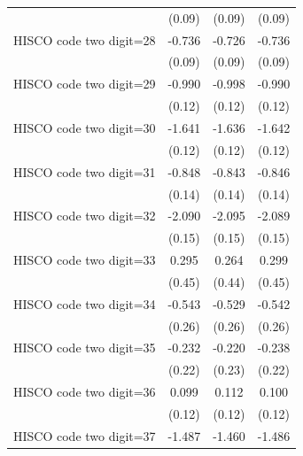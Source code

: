 {\begin{tabular}{l*{3}{c}}
                    &      (0.09)         &      (0.09)         &      (0.09)         \\
HISCO code two digit=28&      -0.736\sym{***}&      -0.726\sym{***}&      -0.736\sym{***}\\
                    &      (0.09)         &      (0.09)         &      (0.09)         \\
HISCO code two digit=29&      -0.990\sym{***}&      -0.998\sym{***}&      -0.990\sym{***}\\
                    &      (0.12)         &      (0.12)         &      (0.12)         \\
HISCO code two digit=30&      -1.641\sym{***}&      -1.636\sym{***}&      -1.642\sym{***}\\
                    &      (0.12)         &      (0.12)         &      (0.12)         \\
HISCO code two digit=31&      -0.848\sym{***}&      -0.843\sym{***}&      -0.846\sym{***}\\
                    &      (0.14)         &      (0.14)         &      (0.14)         \\
HISCO code two digit=32&      -2.090\sym{***}&      -2.095\sym{***}&      -2.089\sym{***}\\
                    &      (0.15)         &      (0.15)         &      (0.15)         \\
HISCO code two digit=33&       0.295         &       0.264         &       0.299         \\
                    &      (0.45)         &      (0.44)         &      (0.45)         \\
HISCO code two digit=34&      -0.543\sym{**} &      -0.529\sym{**} &      -0.542\sym{**} \\
                    &      (0.26)         &      (0.26)         &      (0.26)         \\
HISCO code two digit=35&      -0.232         &      -0.220         &      -0.238         \\
                    &      (0.22)         &      (0.23)         &      (0.22)         \\
HISCO code two digit=36&       0.099         &       0.112         &       0.100         \\
                    &      (0.12)         &      (0.12)         &      (0.12)         \\
HISCO code two digit=37&      -1.487\sym{***}&      -1.460\sym{***}&      -1.486\sym{***}\\

\end{tabular}}
